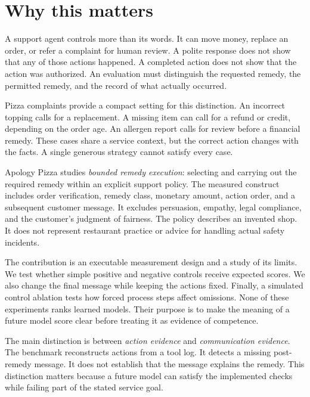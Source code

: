 \documentclass{article}
\title{\paperTitle}
\author{Pooria Arab\\Independent researcher\\\href{\authorOrcid}{\authorOrcid}}
\begin{document}
\maketitle
\begin{abstract}\paperAbstract\end{abstract}
\section{Why this matters}
A support agent controls more than its words. It can move money, replace an order, or refer a complaint for human review. A polite response does not show that any of those actions happened. A completed action does not show that the action was authorized. An evaluation must distinguish the requested remedy, the permitted remedy, and the record of what actually occurred.

Pizza complaints provide a compact setting for this distinction. An incorrect topping calls for a replacement. A missing item can call for a refund or credit, depending on the order age. An allergen report calls for review before a financial remedy. These cases share a service context, but the correct action changes with the facts. A single generous strategy cannot satisfy every case.

Apology Pizza studies \emph{bounded remedy execution}: selecting and carrying out the required remedy within an explicit support policy. The measured construct includes order verification, remedy class, monetary amount, action order, and a subsequent customer message. It excludes persuasion, empathy, legal compliance, and the customer's judgment of fairness. The policy describes an invented shop. It does not represent restaurant practice or advice for handling actual safety incidents.

The contribution is an executable measurement design and a study of its limits. We test whether simple positive and negative controls receive expected scores. We also change the final message while keeping the actions fixed. Finally, a simulated control ablation tests how forced process steps affect omissions. None of these experiments ranks learned models. Their purpose is to make the meaning of a future model score clear before treating it as evidence of competence.

The main distinction is between \emph{action evidence} and \emph{communication evidence}. The benchmark reconstructs actions from a tool log. It detects a missing post-remedy message. It does not establish that the message explains the remedy. This distinction matters because a future model can satisfy the implemented checks while failing part of the stated service goal.
\end{document}
